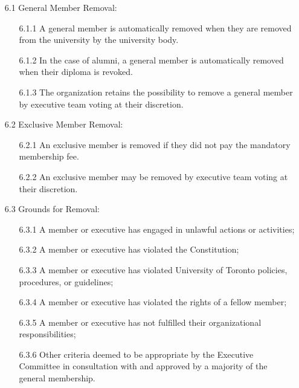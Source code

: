 \documentclass[12pt,a4paper]{article}
\begin{document}
\begin{enumerate}
\item[6.1] General Member Removal:

\begin{enumerate}
\item[6.1.1] A general member is automatically removed when they are removed from the university by the university body.

\item[6.1.2] In the case of alumni, a general member is automatically removed when their diploma is revoked.

\item[6.1.3] The organization retains the possibility to remove a general member by executive team voting at their discretion.
\end{enumerate}

\item[6.2] Exclusive Member Removal:

\begin{enumerate}
\item[6.2.1] An exclusive member is removed if they did not pay the mandatory membership fee.

\item[6.2.2] An exclusive member may be removed by executive team voting at their discretion.
\end{enumerate}

\item[6.3] Grounds for Removal:

\begin{enumerate}
\item[6.3.1] A member or executive has engaged in unlawful actions or activities;

\item[6.3.2] A member or executive has violated the Constitution;

\item[6.3.3] A member or executive has violated University of Toronto policies, procedures, or guidelines;

\item[6.3.4] A member or executive has violated the rights of a fellow member;

\item[6.3.5] A member or executive has not fulfilled their organizational responsibilities;

\item[6.3.6] Other criteria deemed to be appropriate by the Executive Committee in consultation with and approved by a majority of the general membership.
\end{enumerate}


\end{enumerate}
\end{document}
